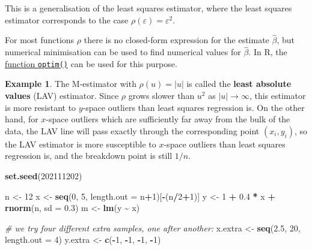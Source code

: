 \documentclass[
  a4paper,
]{article}
\newenvironment{Shaded}{\begin{snugshade}}{\end{snugshade}}
\newcommand{\AttributeTok}[1]{\textcolor[rgb]{0.13,0.29,0.53}{#1}}
\newcommand{\CommentTok}[1]{\textcolor[rgb]{0.56,0.35,0.01}{\textit{#1}}}
\newcommand{\DecValTok}[1]{\textcolor[rgb]{0.00,0.00,0.81}{#1}}
\newcommand{\FloatTok}[1]{\textcolor[rgb]{0.00,0.00,0.81}{#1}}
\newcommand{\FunctionTok}[1]{\textcolor[rgb]{0.13,0.29,0.53}{\textbf{#1}}}
\newcommand{\NormalTok}[1]{#1}
\newcommand{\OtherTok}[1]{\textcolor[rgb]{0.56,0.35,0.01}{#1}}
\newcommand{\SpecialCharTok}[1]{\textcolor[rgb]{0.81,0.36,0.00}{\textbf{#1}}}
\theoremstyle{definition}
\theoremstyle{definition}
\newtheorem{example}{Example}[section]
\theoremstyle{definition}
\theoremstyle{definition}
\theoremstyle{remark}
\begin{document}
This is a generalisation of the least squares estimator, where the least
squares estimator corresponds to the case \(\rho(\varepsilon) = \varepsilon^2\).

For most functions \(\rho\) there is no closed-form expression for
the estimate \(\hat\beta\), but numerical minimisation can be used to find
numerical values for \(\hat\beta\). In R, the \href{https://rdrr.io/r/stats/optim.html}{function \texttt{optim()}}
can be used for this purpose.

\begin{example}
\protect\hypertarget{exm:LAV}{}\label{exm:LAV}The M-estimator with \(\rho(u) = |u|\) is called the
\textbf{least absolute values} (LAV) estimator. Since \(\rho\) grows
slower than \(u^2\) as \(|u| \to\infty\), this estimator is more resistant
to \(y\)-space outliers than least squares regression is. On the other hand,
for \(x\)-space outliers which are sufficiently far away from the bulk of the
data, the LAV line will pass exactly through the corresponding point
\((x_i, y_i)\), so the LAV estimator is more susceptible to \(x\)-space outliers
than least squares regression is, and the breakdown point is still \(1/n\).

\begin{Shaded}
\begin{Highlighting}[]
\FunctionTok{set.seed}\NormalTok{(}\DecValTok{202111202}\NormalTok{)}

\NormalTok{n }\OtherTok{\textless{}{-}} \DecValTok{12}
\NormalTok{x }\OtherTok{\textless{}{-}} \FunctionTok{seq}\NormalTok{(}\DecValTok{0}\NormalTok{, }\DecValTok{5}\NormalTok{, }\AttributeTok{length.out =}\NormalTok{ n}\SpecialCharTok{+}\DecValTok{1}\NormalTok{)[}\SpecialCharTok{{-}}\NormalTok{(n}\SpecialCharTok{/}\DecValTok{2}\SpecialCharTok{+}\DecValTok{1}\NormalTok{)]}
\NormalTok{y }\OtherTok{\textless{}{-}} \DecValTok{1} \SpecialCharTok{+} \FloatTok{0.4} \SpecialCharTok{*}\NormalTok{ x }\SpecialCharTok{+} \FunctionTok{rnorm}\NormalTok{(n, }\AttributeTok{sd =} \FloatTok{0.3}\NormalTok{)}
\NormalTok{m }\OtherTok{\textless{}{-}} \FunctionTok{lm}\NormalTok{(y }\SpecialCharTok{\textasciitilde{}}\NormalTok{ x)}

\CommentTok{\# we try four different extra samples, one after another:}
\NormalTok{x.extra }\OtherTok{\textless{}{-}} \FunctionTok{seq}\NormalTok{(}\FloatTok{2.5}\NormalTok{, }\DecValTok{20}\NormalTok{, }\AttributeTok{length.out =} \DecValTok{4}\NormalTok{)}
\NormalTok{y.extra }\OtherTok{\textless{}{-}} \FunctionTok{c}\NormalTok{(}\SpecialCharTok{{-}}\DecValTok{1}\NormalTok{, }\SpecialCharTok{{-}}\DecValTok{1}\NormalTok{, }\SpecialCharTok{{-}}\DecValTok{1}\NormalTok{, }\SpecialCharTok{{-}}\DecValTok{1}\NormalTok{)}


\end{Highlighting}
\end{Shaded}
\end{example}
\end{document}
